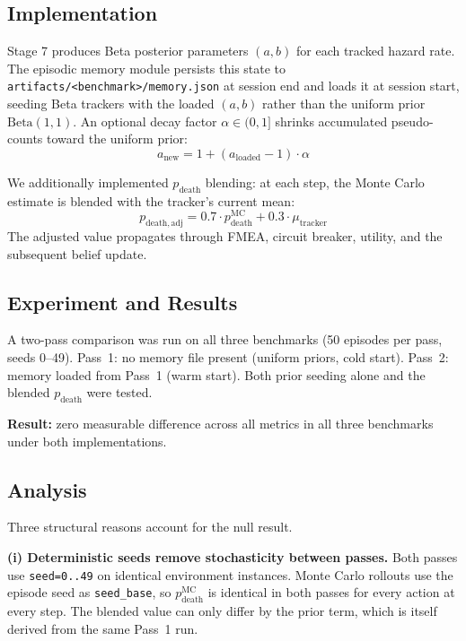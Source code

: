 \documentclass[11pt,letterpaper]{article}
\begin{document}
\subsection{Implementation}

Stage 7 produces Beta posterior parameters $(a, b)$ for each tracked hazard rate.
The episodic memory module persists this state to \texttt{artifacts/<benchmark>/memory.json}
at session end and loads it at session start, seeding Beta trackers with the
loaded $(a, b)$ rather than the uniform prior $\mathrm{Beta}(1, 1)$. An optional
decay factor $\alpha \in (0, 1]$ shrinks accumulated pseudo-counts toward the
uniform prior:
\begin{equation}
  a_{\mathrm{new}} = 1 + (a_{\mathrm{loaded}} - 1) \cdot \alpha
  \label{eq:decay}
\end{equation}

We additionally implemented $p_{\mathrm{death}}$ blending: at each step, the
Monte Carlo estimate is blended with the tracker's current mean:
\begin{equation}
  p_{\mathrm{death,adj}} = 0.7 \cdot p_{\mathrm{death}}^{\mathrm{MC}}
                         + 0.3 \cdot \mu_{\mathrm{tracker}}
  \label{eq:blend}
\end{equation}
The adjusted value propagates through FMEA, circuit breaker, utility, and the
subsequent belief update.

\subsection{Experiment and Results}

A two-pass comparison was run on all three benchmarks (50 episodes per pass,
seeds 0--49). Pass~1: no memory file present (uniform priors, cold start).
Pass~2: memory loaded from Pass~1 (warm start). Both prior seeding alone and
the blended $p_{\mathrm{death}}$ were tested.

\textbf{Result:} zero measurable difference across all metrics in all three
benchmarks under both implementations.

\subsection{Analysis}

Three structural reasons account for the null result.

\textbf{(i) Deterministic seeds remove stochasticity between passes.}
Both passes use \texttt{seed=0..49} on identical environment instances.
Monte Carlo rollouts use the episode seed as \texttt{seed\_base}, so
$p_{\mathrm{death}}^{\mathrm{MC}}$ is identical in both passes for every action
at every step. The blended value can only differ by the prior term, which is
itself derived from the same Pass~1 run.
\end{document}
